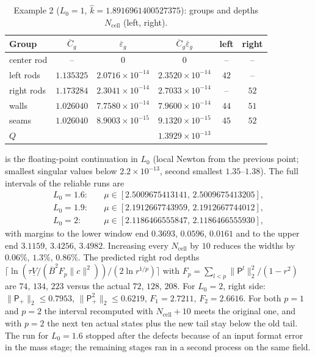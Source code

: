 \begin{table}[tbhp]
\caption{Example 2 ($L_0=1$, $\widehat k=1.8916961400527375$): groups and depths
$N_{\mathrm{cell}}$ (left, right).}
\label{sm:tab-ex2}
\centering\small
\begin{tabular}{lccccc}
\toprule
Group & $\overline C_g$ & $\overline\varepsilon_g$ & $\overline C_g\overline\varepsilon_g$ & left & right\\
\midrule
center rod & -- & $0$ & $0$ & -- & --\\
left rods & $1.135325$ & $2.0716\times10^{-14}$ & $2.3520\times10^{-14}$ & $42$ & --\\
right rods & $1.173284$ & $2.3041\times10^{-14}$ & $2.7033\times10^{-14}$ & -- & $52$\\
walls & $1.026040$ & $7.7580\times10^{-14}$ & $7.9600\times10^{-14}$ & $44$ & $51$\\
seams & $1.026040$ & $8.9003\times10^{-15}$ & $9.1320\times10^{-15}$ & $45$ & $52$\\
\midrule
$Q$ & & & $1.3929\times10^{-13}$ & &\\
\bottomrule
\end{tabular}
\end{table}

 is the floating-point continuation in $L_0$ (local Newton from the
previous point; smallest singular values below $2.2\times10^{-13}$, second smallest
$1.35$--$1.38$). The full intervals of the reliable runs are
\begin{align*}
  L_0=1.6:&\quad\mu\in[2.5009675413141,\,2.5009675413205],\\
  L_0=1.9:&\quad\mu\in[2.1912667743959,\,2.1912667744012],\\
  L_0=2:&\quad\mu\in[2.1186466555847,\,2.1186466555930],
\end{align*}
with margins to the lower window end $0.3693$, $0.0596$, $0.0161$ and to the upper
end $3.1159$, $3.4256$, $3.4982$. Increasing every $N_{\mathrm{cell}}$ by $10$ reduces
the widths by $0.06\%$, $1.3\%$, $0.86\%$. The predicted right rod depths
$\lceil\ln(\tau\underline V/(\overline B^2F_p\|c\|^2))/(2\ln r^{1/p})\rceil$ with
$F_p=\sum_{l<p}\|\mathsf P^l\|_2^2/(1-r^2)$ are $74$, $134$, $223$ versus the actual
$72$, $128$, $208$. For $L_0=2$, right side: $\|\mathsf P_+\|_2\le0.7953$,
$\|\mathsf P_+^2\|_2\le0.6219$, $F_1=2.7211$, $F_2=2.6616$. For both $p=1$ and $p=2$
the interval recomputed with $N_{\mathrm{cell}}+10$ meets the original one, and with
$p=2$ the next ten actual states plus the new tail stay below the old tail. The run
for $L_0=1.6$ stopped after the defects because of an input format error in the mass
stage; the remaining stages ran in a second process on the same field.


